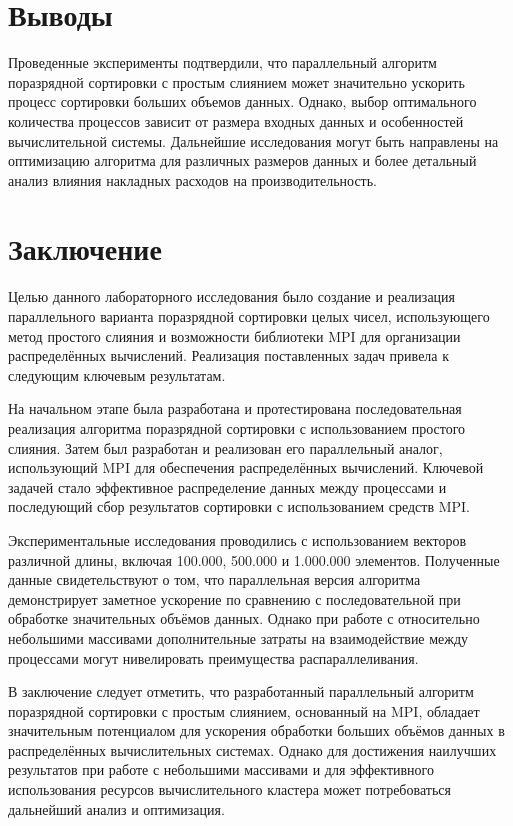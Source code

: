 \documentclass[a4paper, 14pt]{article}
\begin{document}
\section*{Выводы}
\indent Проведенные эксперименты подтвердили, что параллельный алгоритм поразрядной сортировки с простым слиянием может значительно ускорить процесс сортировки больших объемов данных. Однако, выбор оптимального количества процессов зависит от размера входных данных и особенностей вычислительной системы. Дальнейшие исследования могут быть направлены на оптимизацию алгоритма для различных размеров данных и более детальный анализ влияния накладных расходов на производительность.






    
	
	\newpage
	\section*{\centering Заключение}
	
	Целью данного лабораторного исследования было создание и реализация параллельного варианта поразрядной сортировки целых чисел, использующего метод простого слияния и возможности библиотеки MPI для организации распределённых вычислений. Реализация поставленных задач привела к следующим ключевым результатам.

На начальном этапе была разработана и протестирована последовательная реализация алгоритма поразрядной сортировки с использованием простого слияния. Затем был разработан и реализован его параллельный аналог, использующий MPI для обеспечения распределённых вычислений. Ключевой задачей стало эффективное распределение данных между процессами и последующий сбор результатов сортировки с использованием средств MPI.

Экспериментальные исследования проводились с использованием векторов различной длины, включая 100.000, 500.000 и 1.000.000 элементов. Полученные данные свидетельствуют о том, что параллельная версия алгоритма демонстрирует заметное ускорение по сравнению с последовательной при обработке значительных объёмов данных. Однако при работе с относительно небольшими массивами дополнительные затраты на взаимодействие между процессами могут нивелировать преимущества распараллеливания.

В заключение следует отметить, что разработанный параллельный алгоритм поразрядной сортировки с простым слиянием, основанный на MPI, обладает значительным потенциалом для ускорения обработки больших объёмов данных в распределённых вычислительных системах. Однако для достижения наилучших результатов при работе с небольшими массивами и для эффективного использования ресурсов вычислительного кластера может потребоваться дальнейший анализ и оптимизация.
	
\end{document}
